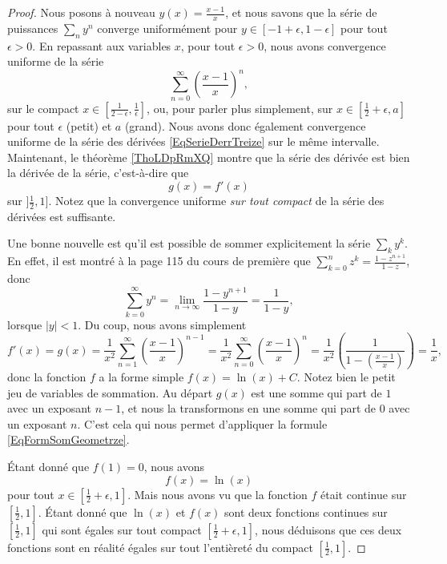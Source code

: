 \begin{proof}
	Nous posons à nouveau \( y(x)=\frac{ x-1 }{ x }\), et nous savons que la série de puissances \( \sum_ny^n\) converge uniformément pour \( y\in[-1+\epsilon,1-\epsilon]\) pour tout \( \epsilon>0\). En repassant aux variables \( x\), pour tout \( \epsilon>0\), nous avons convergence uniforme de la série
	\begin{equation}
		\sum_{n=0}^{\infty} \left( \frac{ x-1 }{ x } \right)^n,
	\end{equation}
	sur le compact \( x\in[\frac{ 1 }{ 2-\epsilon },\frac{1}{ \epsilon }]\), ou, pour parler plus simplement, sur \( x\in[\frac{ 1 }{2}+\epsilon,a]\) pour tout \( \epsilon\) (petit) et \( a\) (grand). Nous avons donc également convergence uniforme de la série des dérivées \eqref{EqSerieDerrTreize} sur le même intervalle. Maintenant, le théorème \ref{ThoLDpRmXQ} montre que la série des dérivée est bien la dérivée de la série, c'est-à-dire que
	\begin{equation}
		g(x)=f'(x)
	\end{equation}
	sur \( ]\frac{ 1 }{ 2 },1]\). Notez que la convergence uniforme \emph{sur tout compact} de la série des dérivées est suffisante.

	Une bonne nouvelle est qu'il est possible de sommer explicitement la série \( \sum_ky^k\). En effet, il est montré à la page 115 du cours de première que \( \sum_{k=0}^n z^k=\frac{ 1-z^{n+1} }{ 1-z }\), donc
	\begin{equation}		\label{EqFormSomGeometrze}
		\sum_{k=0}^{\infty}y^n=\lim_{n\to\infty}\frac{1-y^{n+1}}{ 1-y }=\frac{1}{ 1-y },
	\end{equation}
	lorsque \( | y |<1\). Du coup, nous avons simplement
	\begin{equation}
		f'(x)=g(x)=\frac{1}{ x^2 }\sum_{n=1}^{\infty}\left( \frac{ x-1 }{ x } \right)^{n-1}=\frac{1}{ x^2 }\sum_{n=0}^{\infty}\left( \frac{ x-1 }{ x } \right)^n=\frac{1}{ x^2 }\left( \frac{1}{  1-\left( \frac{ x-1 }{ x } \right)  } \right)=\frac{1}{ x },
	\end{equation}
	donc la fonction \( f\) a la forme simple \( f(x)=\ln(x)+C\). Notez bien le petit jeu de variables de sommation. Au départ \( g(x)\) est une somme qui part de \( 1\) avec un exposant \( n-1\), et nous la transformons en une somme qui part de \( 0\) avec un exposant \( n\). C'est cela qui nous permet d'appliquer la formule \eqref{EqFormSomGeometrze}.

	Étant donné que \( f(1)=0\), nous avons
	\begin{equation}
		f(x)=\ln(x)
	\end{equation}
	pour tout \( x\in[\frac{ 1 }{2}+\epsilon,1]\). Mais nous avons vu que la fonction \( f\) était continue sur \( [\frac{ 1 }{2},1]\). Étant donné que \( \ln(x)\) et \( f(x)\) sont deux fonctions continues sur \( [\frac{ 1 }{2},1]\) qui sont égales sur tout compact \( [\frac{ 1 }{2}+\epsilon,1]\), nous déduisons que ces deux fonctions sont en réalité égales sur tout l'entièreté du compact \( [\frac{ 1 }{2},1]\).


\end{proof}
